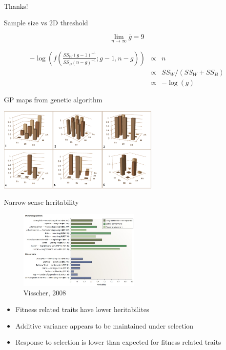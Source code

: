 \documentclass{beamer}
\begin{document}
\begin{frame}
\centering
Thanks!
\end{frame}


\begin{frame}{Sample size vs 2D threshold}


\begin{equation}
\lim_{n \to \infty} \bar{g} = 9 \nonumber
\end{equation}

\begin{eqnarray}
-\log \left ( f \left (
\frac{
 SS_{W}  (g - 1)^{-1}
}
{  SS_{B} (n - g)^{-1}
}; g - 1, n - g
\right ) \right )
& \propto &
 n \nonumber \\ 
& \propto &
SS_{W} / (SS_{W} + SS_{B}) \nonumber \\
& \propto &
-\log(g) \nonumber
\label{eq:ftest_n}
\end{eqnarray}

\end{frame}



\begin{frame}{GP maps from genetic algorithm}
\begin{center}
\includegraphics[width=8cm]{gpmaps2.pdf}
\end{center}
\end{frame}

\begin{frame}{Narrow-sense heritability}
\begin{figure}
\includegraphics[width=6cm]{visscher2008_heritabiliy.jpg} \\
{\tiny Visscher, 2008}
\end{figure}
\begin{itemize}
\item Fitness related traits have lower heritabilites
\item Additive variance appears to be maintained under selection
\item Response to selection is lower than expected for fitness related traits
\end{itemize}
\end{frame}
\end{document}
